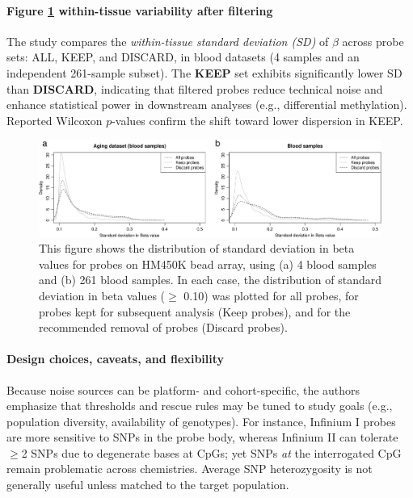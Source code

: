 \documentclass[10pt]{extarticle}
\begin{document}
\paragraph{Figure \ref{fig:std} within-tissue variability after filtering}
The study compares the \emph{within-tissue standard deviation (SD)} of \(\beta\) across probe sets: ALL, KEEP, and DISCARD, in blood datasets (4 samples and an independent 261-sample subset). The \textbf{KEEP} set exhibits significantly lower SD than \textbf{DISCARD}, indicating that filtered probes reduce technical noise and enhance statistical power in downstream analyses (e.g., differential methylation). Reported Wilcoxon \(p\)-values confirm the shift toward lower dispersion in KEEP. 

\begin{figure}[h]
  \centering
  \includegraphics[width=0.9\linewidth]{Figures/This figure shows the distribution of standard deviation in beta values for probes on HM450K bead array, using (a) 4 blood.jpg}
  \caption{This figure shows the distribution of standard deviation in beta values for probes on HM450K bead array, using (a) 4 blood
samples and (b) 261 blood samples. In each case, the distribution of standard deviation in beta values ($\geq$ 0.10) was plotted for all probes, for
probes kept for subsequent analysis (Keep probes), and for the recommended removal of probes (Discard probes).}
  \label{fig:std}
\end{figure}

\paragraph{Design choices, caveats, and flexibility}
Because noise sources can be platform- and cohort-specific, the authors emphasize that thresholds and rescue rules may be tuned to study goals (e.g., population diversity, availability of genotypes). For instance, Infinium I probes are more sensitive to SNPs in the probe body, whereas Infinium II can tolerate \(\geq\)2 SNPs due to degenerate bases at CpGs; yet SNPs \emph{at} the interrogated CpG remain problematic across chemistries. Average SNP heterozygosity is not generally useful unless matched to the target population. 
\end{document}
